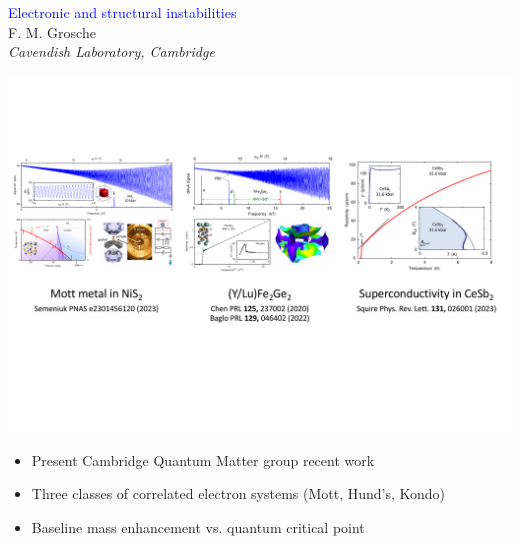 
\begin{emptyframe}
\begin{center}
\textcolor{Blue}{Electronic and structural instabilities} \\
\vspace{0.5em}
{\footnotesize F. M. Grosche} \\
{\footnotesize \em Cavendish Laboratory, Cambridge} \\
\vspace{0.1em}
\end{center}
\vspace{0.0em}
\centerline{ \includegraphics[width=\columnwidth]{IntroPicture5}}

\begin{itemize}
    \item<1-> Present Cambridge Quantum Matter group recent work
    \item<2-> Three classes of correlated electron systems (Mott, Hund's, Kondo)
    \item<3-> Baseline mass enhancement vs. quantum critical point
\end{itemize}
\end{emptyframe}



